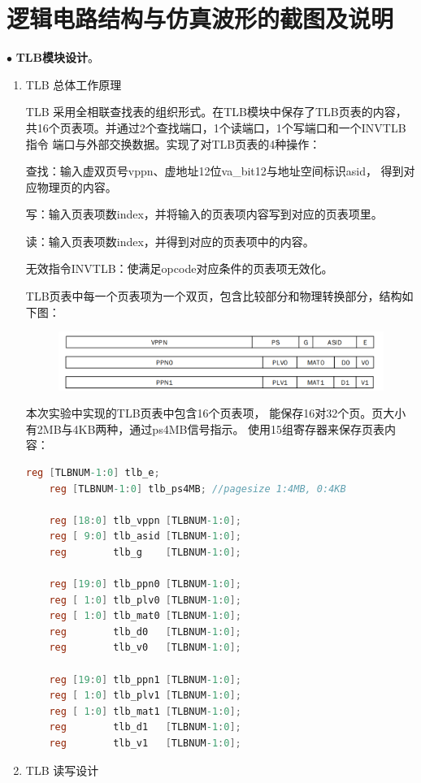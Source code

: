 \documentclass[11pt]{article}
\begin{document}


\section{逻辑电路结构与仿真波形的截图及说明}
\noindent
$\bullet$
\textbf{TLB模块设计}。
\begin{enumerate}
  \item TLB 总体工作原理\par
  TLB 采用全相联查找表的组织形式。在TLB模块中保存了TLB页表的内容，共16个页表项。并通过2个查找端口，1个读端口，1个写端口和一个INVTLB指令
  端口与外部交换数据。实现了对TLB页表的4种操作：\par
  查找：输入虚双页号vppn、虚地址12位va_bit12与地址空间标识asid，
  得到对应物理页的内容。\par
  写：输入页表项数index，并将输入的页表项内容写到对应的页表项里。\par
  读：输入页表项数index，并得到对应的页表项中的内容。\par
  无效指令INVTLB：使满足opcode对应条件的页表项无效化。\par
  TLB页表中每一个页表项为一个双页，包含比较部分和物理转换部分，结构如下图：
  \begin{figure}[H]
    \centering
    \includegraphics[width=13cm]{fig/1.png}
  \end{figure}
  本次实验中实现的TLB页表中包含16个页表项，
  能保存16对32个页。页大小有2MB与4KB两种，通过ps4MB信号指示。
  使用15组寄存器来保存页表内容：
  \begin{lstlisting}[language=verilog]
    reg [TLBNUM-1:0] tlb_e;
    reg [TLBNUM-1:0] tlb_ps4MB; //pagesize 1:4MB, 0:4KB

    reg [18:0] tlb_vppn [TLBNUM-1:0];
    reg [ 9:0] tlb_asid [TLBNUM-1:0];
    reg        tlb_g    [TLBNUM-1:0];

    reg [19:0] tlb_ppn0 [TLBNUM-1:0];
    reg [ 1:0] tlb_plv0 [TLBNUM-1:0];
    reg [ 1:0] tlb_mat0 [TLBNUM-1:0];
    reg        tlb_d0   [TLBNUM-1:0];
    reg        tlb_v0   [TLBNUM-1:0];

    reg [19:0] tlb_ppn1 [TLBNUM-1:0];
    reg [ 1:0] tlb_plv1 [TLBNUM-1:0];
    reg [ 1:0] tlb_mat1 [TLBNUM-1:0];
    reg        tlb_d1   [TLBNUM-1:0];
    reg        tlb_v1   [TLBNUM-1:0];
  \end{lstlisting}
  \item TLB 读写设计\par


\end{enumerate}
\end{document}
